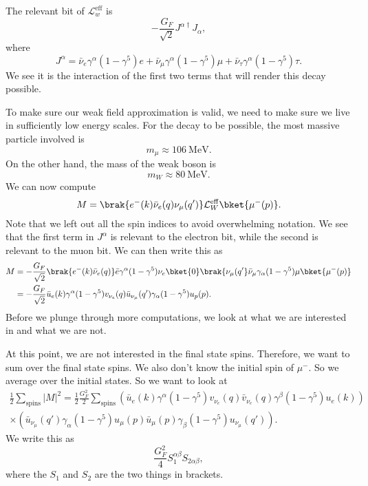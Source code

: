 \documentclass[a4paper]{article}
\begin{document}
The relevant bit of $\mathcal{L}_w^{\mathrm{eff}}$ is
\[
  - \frac{G_F}{\sqrt{2}} J^{\alpha\dagger}J_\alpha,
\]
where
\[
  J^\alpha = \bar{\nu}_e \gamma^\alpha (1 - \gamma^5) e + \bar{\nu}_\mu \gamma^\alpha(1 - \gamma^5)\mu + \bar{\nu}_\tau \gamma^\alpha(1 - \gamma^5) \tau.
\]
We see it is the interaction of the first two terms that will render this decay possible.

To make sure our weak field approximation is valid, we need to make sure we live in sufficiently low energy scales. For the decay to be possible, the most massive particle involved is
\[
  m_\mu \approx \SI{106}{\mega\electronvolt}.
\]
On the other hand, the mass of the weak boson is
\[
  m_W \approx \SI{80}{\mega\electronvolt}.
\]
We can now compute
\[
  M = \brak{e^-(k) \bar{\nu}_e (q) \nu_\mu(q')} \mathcal{L}_W^{\mathrm{eff}} \bket{\mu^-(p)}.
\]
Note that we left out all the spin indices to avoid overwhelming notation. We see that the first term in $J^\alpha$ is relevant to the electron bit, while the second is relevant to the muon bit. We can then write this as
\begin{align*}
  M &= -\frac{G_F}{\sqrt{2}} \brak{e^-(k) \bar{\nu}_e(q)} \bar{e} \gamma^\alpha (1 - \gamma^5) \nu_e \bket{0} \brak{\nu_\mu(q'} \bar{\nu}_\mu \gamma_\alpha(1 - \gamma^5) \mu \bket{\mu^-(p)}\\
  &= - \frac{G_F}{\sqrt{2}} \bar{u}_e(k) \gamma^\alpha (1 - \gamma^5)v_{\nu_e}(q) \bar{u}_{\nu_\mu} (q') \gamma_\alpha (1 - \gamma^5) u_p(p).
\end{align*}
Before we plunge through more computations, we look at what we are interested in and what we are not.

At this point, we are not interested in the final state spins. Therefore, we want to sum over the final state spins. We also don't know the initial spin of $\mu^-$. So we average over the initial states. So we want to look at
\begin{multline*}
  \frac{1}{2} \sum_{\mathrm{spins}} |M|^2 = \frac{1}{2} \frac{G_F^2}{2} \sum_{\mathrm{spins}} \left(\bar{u}_e(k) \gamma^\alpha (1 - \gamma^5) v_{\nu_e}(q) \bar{v}_{\nu_e}(q) \gamma^\beta (1 - \gamma^5) u_e(k)\right)\\
  \times \left(\bar{u}_{\nu_\mu} (q') \gamma_\alpha (1 - \gamma^5) u_\mu(p) \bar{u}_\mu (p) \gamma_\beta(1 - \gamma^5) u_{\nu_\mu}(q')\right).
\end{multline*}
We write this as
\[
  \frac{G_F^2}{4} S_1^{\alpha\beta}S_{2\alpha\beta},
\]
where the $S_1$ and $S_2$ are the two things in brackets.
\end{document}
